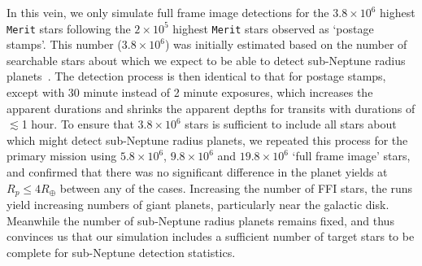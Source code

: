 In this vein, we only simulate full frame image detections for the
$3.8\times10^6$ highest \texttt{Merit} stars following the
$2\times10^5$ highest \texttt{Merit} stars observed as `postage
stamps'.  This number ($3.8\times10^6$) was initially estimated based
on the number of searchable stars about which we expect \tess to be
able to detect sub-Neptune radius
planets~\citep{winn_searchable_2013}.  The detection process is then
identical to that for postage stamps, except with 30 minute instead of
2 minute exposures, which increases the apparent durations and shrinks
the apparent depths for transits with durations of $\lesssim$1 hour.
To ensure that $3.8\times10^6$ stars is sufficient to include all
stars about which \tess might detect sub-Neptune radius planets, we
repeated this process for the primary mission using $5.8\times10^6$,
$9.8\times10^6$ and $19.8\times10^6$ `full frame image' stars, and
confirmed that there was no significant difference in the planet
yields at $R_p\le4R_\oplus$ between any of the cases.
Increasing the number of FFI stars, the runs yield
increasing numbers of giant planets, particularly near the galactic
disk.  Meanwhile the number of sub-Neptune radius planets remains
fixed, and thus convinces us that our simulation includes a sufficient
number of target stars to be complete for sub-Neptune detection statistics.
